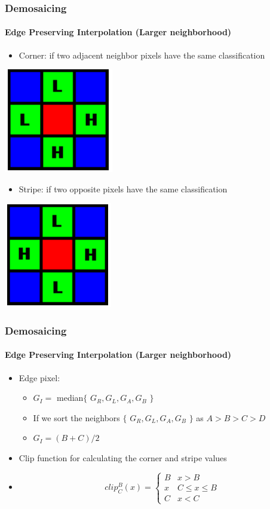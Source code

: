 \documentclass{beamer}
\begin{document}
\begin{frame}
\frametitle{Demosaicing}
\framesubtitle{Edge Preserving Interpolation \small{(Larger neighborhood)}}

\footnotesize{
\begin{itemize}
\item Corner: if two adjacent neighbor pixels have the same classification
\end{itemize}
}
\begin{center}
\includegraphics[scale=0.33]{images/L7_PRI_Corner.png}
\end{center}

\footnotesize{
\begin{itemize}
\item Stripe: if two opposite pixels have the same classification 
\end{itemize}
}
\begin{center}\includegraphics[scale=0.33]{images/L7_PRI_Stripe.png}\end{center}
\end{frame}
\begin{frame}
\frametitle{Demosaicing}
\framesubtitle{Edge Preserving Interpolation \small{(Larger neighborhood)}}
\begin{itemize}
\item Edge pixel:
\begin{itemize}
\item $G_{I} = $ median$\{$ $G_{R},G_{L},G_{A},G_{B}$ $\}$
\item If we sort the neighbors $\{$ $G_{R},G_{L},G_{A},G_{B}$ $\}$ as $A>B>C>D$
\item $G_{I} = (B+C)/2$
\end{itemize}
\item Clip function for calculating the corner and stripe values
\item[]
\[
clip^{B}_{C}(x)=
\begin{cases}
B & x > B\\
x & C \leq x \leq B\\
C & x < C
\end{cases}
\]
\end{itemize}
\end{frame}
\end{document}
